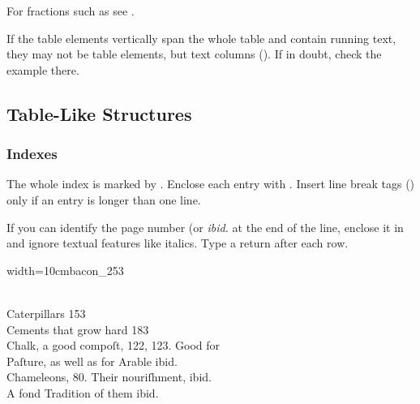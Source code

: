 \vspace{-5mm}
\begin{crossref}
For fractions such as  see .
\end{crossref}

\vspace{3mm}
\begin{note}
If the table elements vertically span the whole table and contain running text, they may not be table elements, but text columns (). If in doubt, check the example there.
\end{note}



\tocspace
\subsection{Table-Like Structures}
\label{section table-like structures}

\subsubsection{Indexes}
\label{section indexes}

\begin{mainrule}
  The whole index is marked by . Enclose each entry with . Insert line break tags () only if an entry is longer than one line.

  If you can identify the page number (or \emph{ibid.} at the end of the line, enclose it in  and ignore textual features like italics. Type a return after each row.
\end{mainrule}



\begin{sampleImageSmall}[ 1]{width=10cm}{bacon_253}

\begin{typeLatin}
 \\
Caterpillars  153 \\
Cements that grow hard  183 \\
Chalk, a good compoſt, 122, 123. Good for \\
Paſture, as well as for Arable  ibid. \\
Chameleons, 80. Their nouriſhment,  ibid. \\
A fond Tradition of them ibid. \\
\end{typeLatin}
\end{sampleImageSmall}

